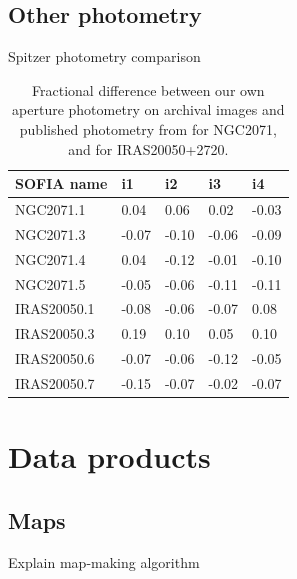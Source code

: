 \subsection{Other photometry}
\renewcommand{\arraystretch}{1.5}
\def\labelitemi{--}
\begin{table}[!h]
\scriptsize
\caption{Spitzer photometry comparison}
\vspace{-0.5cm}
\begin{longtable}{l|P{1cm}P{1cm}P{1cm}P{1cm}}
\toprule																			
SOFIA name	&	i1	&	i2	&	i3	&	i4	\\
\midrule									
NGC2071.1	&	0.04	&	0.06	&	0.02	&	-0.03	\\
NGC2071.3	&	-0.07	&	-0.10	&	-0.06	&	-0.09	\\
NGC2071.4	&	0.04	&	-0.12	&	-0.01	&	-0.10	\\
NGC2071.5	&	-0.05	&	-0.06	&	-0.11	&	-0.11	\\
\midrule									
IRAS20050.1	&	-0.08	&	-0.06	&	-0.07	&	0.08	\\
IRAS20050.3	&	0.19	&	0.10	&	0.05	&	0.10	\\
IRAS20050.6	&	-0.07	&	-0.06	&	-0.12	&	-0.05	\\
IRAS20050.7	&	-0.15	&	-0.07	&	-0.02	&	-0.07	\\
\bottomrule					
	\end{longtable} 
\caption*{Fractional difference between our own aperture photometry on \Spitzer archival images and published \Spitzer photometry from \citet{Megeath:2012cn} for NGC2071, and \citet{Gutermuth:2009gca} for IRAS20050+2720. }
\label{tab:SpitzerPhotometry}
\end{table}

\section{Data products}

\subsection{Maps}

Explain map-making algorithm

